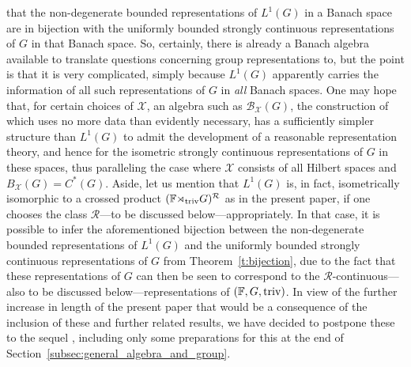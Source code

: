 \documentclass{amsart}
\theoremstyle{plain}
\theoremstyle{definition}
\numberwithin{equation}{section}
\begin{document}
\cite[Proposition~2.1]{johnson} that the non-degenerate bounded representations of $L^1(G)$ in a Banach space are in bijection with the uniformly bounded strongly continuous representations of $G$ in that Banach space. So, certainly, there is already a Banach algebra available to translate questions concerning group representations to, but the point is that it is very complicated, simply because $L^1(G)$ apparently carries the information of all such representations of $G$ in \emph{all} Banach spaces. One may hope that, for certain choices of ${\mathcal X}$, an algebra such as $\mathcal B_{\mathcal X}(G)$, the construction of which uses no more data than evidently necessary, has a sufficiently simpler structure than $L^1(G)$ to admit the development of a reasonable representation theory, and hence for the isometric strongly continuous representations of $G$ in these spaces, thus paralleling the case where ${\mathcal X}$ consists of all Hilbert spaces and $B_{\mathcal X}(G)=C^*(G)$. Aside, let us mention that $L^1(G)$ is, in fact, isometrically isomorphic to a crossed product $(\mathbb F{\rtimes}_{\textup{triv}} G)^{\mathcal R}$ as in the present paper, if one chooses the class ${\mathcal R}$---to be discussed below---appropriately. In that case, it is possible to infer the aforementioned bijection between the non-degenerate bounded representations of $L^1(G)$ and the uniformly bounded strongly continuous representations of $G$ from Theorem~\ref{t:bijection}, due to the fact that these representations of $G$ can then be seen to correspond to the ${\mathcal R}$-continuous---also to be discussed below---representations of $(\mathbb F,G,{\textup{triv}})$. In view of the further increase in length of the present paper that would be a consequence of the inclusion of these and further related results, we have decided to postpone these to the sequel \cite{crossedtwo}, including only some preparations for this at the end of Section~\ref{subsec:general_algebra_and_group}.
\end{document}
